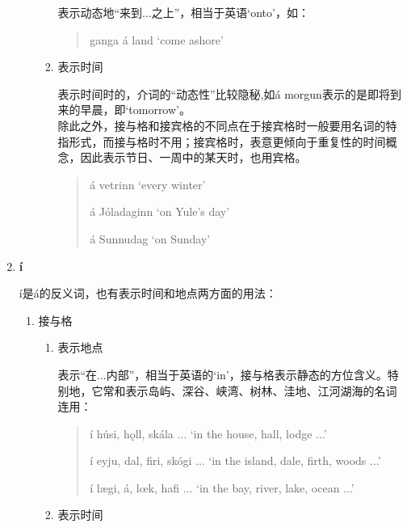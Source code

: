 \begin{enumerate}[itemindent=1em, label=\textbf{\arabic*}.]
\begin{enumerate}
\begin{enumerate}
                              表示动态地“来到...之上”，相当于英语`onto'，如：
                              \begin{quote}
                                  ganga á land `come ashore'
                              \end{quote}
                        \item 表示时间

                              表示时间时的，介词的“动态性”比较隐秘,如á morgun表示的是即将到来的早晨，即`tomorrow'。\\
                              除此之外，接与格和接宾格的不同点在于接宾格时一般要用名词的特指形式，而接与格时不用；接宾格时，表意更倾向于重复性的时间概念，因此表示节日、一周中的某天时，也用宾格。
                              \begin{quote}
                                  á vetrinn `every winter'

                                  á Jóladaginn `on Yule's day'

                                  á Sunnudag `on Sunday'
                              \end{quote}


                    \end{enumerate}
          \end{enumerate}

    \item \textbf{í} \label{prep:in}

          í是á的反义词，也有表示时间和地点两方面的用法：
          \begin{enumerate}
              \item 接与格
                    \begin{enumerate}
                        \item 表示地点

                              表示“在...内部”，相当于英语的`in'，接与格表示静态的方位含义。特别地，它常和表示岛屿、深谷、峡湾、树林、洼地、江河湖海的名词连用：
                              \begin{quote}
                                  í húsi, h\k{o}ll, skála ... `in the house, hall, lodge ...'

                                  í eyju, dal, fir\dh i, skógi ... `in the island, dale, firth, woods ...'

                                  í lægi, á, lœk, hafi ... `in the bay, river, lake, ocean ...'
                                  \label{quote_hafi}
                              \end{quote}
                        \item 表示时间


\end{enumerate}
\end{enumerate}
\end{enumerate}
